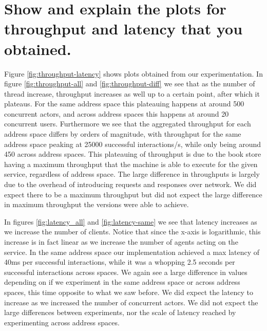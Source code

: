 \documentclass{article}
\begin{document}
\section{Show and explain the plots for throughput and latency that you obtained.}

Figure \ref{fig:throughput-latency} shows plots obtained from our experimentation. In figure \ref{fig:throughput-all} and \ref{fig:throughput-diff} we see that as the number of thread increase, throughput increases as well up to a certain point, after which it plateaus. For the same address space this plateauing happens at around 500 concurrent actors, and across address spaces this happens at around 20 concurrent users. Furthermore we see that the aggregated throughput for each address space differs by orders of magnitude, with throughput for the same address space peaking at 25000 successful interactions/s, while only being around 450 across address spaces. This plateauing of throughput is due to the book store having a maximum throughput that the machine is able to execute for the given service, regardless of address space. The large difference in throughputs is largely due to the overhead of introducing requests and responses over network. We did expect there to be a maximum throughput but did not expect the large difference in maximum throughput the versions were able to achieve.

In figures \ref{fig:latency_all} and \ref{fig:latency-same} we see that latency increases as we increase the number of clients. Notice that since the x-axis is logarithmic, this increase is in fact linear as we increase the number of agents acting on the service. In the same address space our implementation achieved a max latency of 40ms per successful interactions, while it was a whopping 2.5 seconds per successful interactions across spaces.
We again see a large difference in values depending on if we experiment in the same address space or across address spaces, this time opposite to what we saw before. We did expect the latency to increase as we increased the number of concurrent actors. We did not expect the large differences between experiments, nor the scale of latency reached by experimenting across address spaces. 
\end{document}
